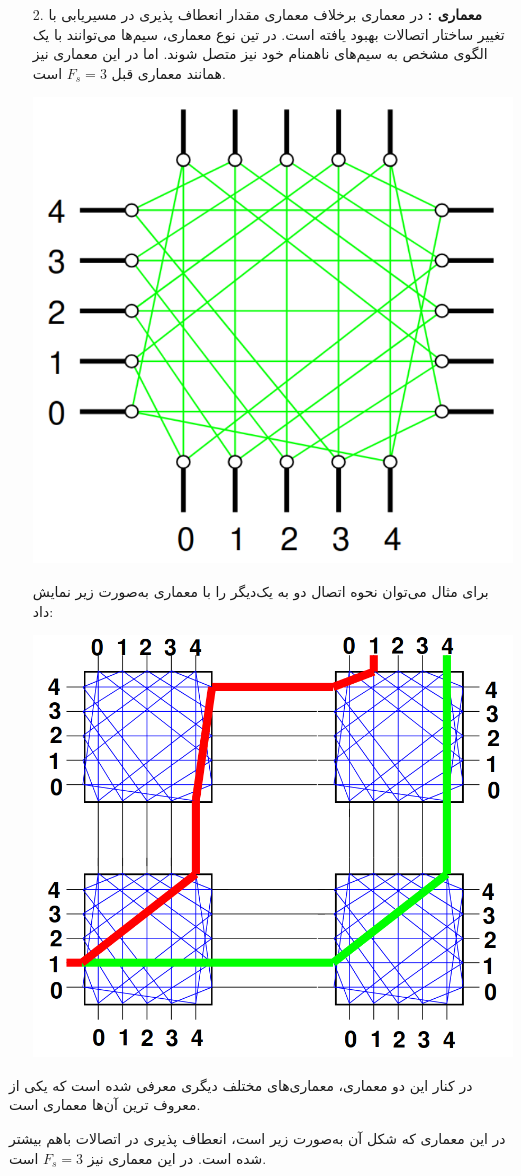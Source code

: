 \begin{qsolve}
	
	\begin{enumerate}
		\item [2.]
		\textbf{معماری :}				در معماری  برخلاف معماری  مقدار انعطاف پذیری در مسیریابی با تغییر ساختار اتصالات بهبود یافته است. در تین نوع معماری، سیم‌ها می‌توانند با یک الگوی مشخص به سیم‌های ناهمنام خود نیز متصل شوند. اما در این معماری نیز همانند معماری قبل $F_s=3 $ است. 
			
		\begin{center}
			\includegraphics*[width=0.4\linewidth]{pics/Q5.png}
			\label{معماری سوئیچ ویلتون}
		\end{center}
			
			
			برای مثال می‌توان نحوه اتصال دو  به یک‌دیگر را با معماری  به‌صورت زیر نمایش داد:
			
			\begin{center}
				\includegraphics*[width=0.5\linewidth]{pics/Q8.png}
				\label{اتصال۲}
			\end{center}
			
\end{enumerate}
	
	
	
	
	در کنار این دو معماری، معماری‌های مختلف دیگری معرفی شده است که یکی از معروف ترین آن‌ها معماری  است.
	
	در این معماری که شکل آن به‌صورت زیر است، انعطاف پذیری در اتصالات باهم بیشتر شده است. در این معماری نیز $F_s=3 $ است.
	
\end{qsolve}



